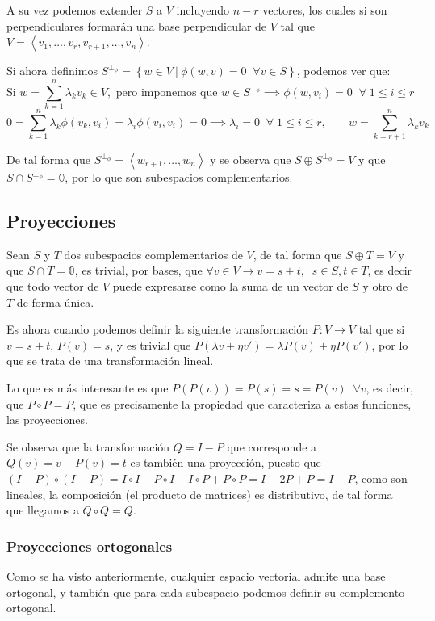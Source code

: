 \documentclass{preset}
\begin{document}
A su vez podemos extender $S$ a $V$ incluyendo $n-r$ vectores, los cuales si son perpendiculares formarán una base perpendicular de $V$ tal que $V=\left<v_1,\dots,v_r,v_{r+1},\dots,v_n\right>$.

\noindent Si ahora definimos $S^{\perp_\phi}=\left\{w \in V \: \vert \: \phi(w,v)=0 \;\; \forall v \in S\right\}$, podemos ver que:
\vspace{-10pt}
\[\mbox{Si } w=\sum_{k=1}^n{\lambda_kv_k} \in V, \mbox{ pero imponemos que } w\in S^{\perp_\phi} \implies \phi(w,v_i)=0 \;\; \forall \; 1\leq i\leq r\]
\vspace{-15pt}
\[0=\sum_{k=1}^n{\lambda_k \phi(v_k,v_i)}=\lambda_i \phi(v_i,v_i)=0 \implies \lambda_i=0 \;\; \forall \; 1\leq i\leq r, \;\;\;\;\;\;\; w=\sum_{k=r+1}^n{\lambda_k v_k}\]

\noindent De tal forma que $S^{\perp_\phi}=\left<w_{r+1},\dots,w_n\right>$ y se observa que $S\oplus S^{\perp_\phi}=V$ y que $S\cap S^{\perp_\phi}=\mathbb{0}$, por lo que son subespacios complementarios.

\vspace{-15pt}
\subsection{Proyecciones}
Sean $S$ y $T$ dos subespacios complementarios de $V$, de tal forma que $S\oplus T=V$ y que $S\cap T=\mathbb{0}$, es trivial, por bases, que $\forall v \in V \rightarrow v=s+t, \;\; s\in S, t\in T$, es decir que todo vector de $V$ puede expresarse como la suma de un vector de $S$ y otro de $T$ de forma única.

Es ahora cuando podemos definir la siguiente transformación $P: V\rightarrow V$ tal que si $v=s+t$, $P(v)=s$, y es trivial que $P(\lambda v+\eta v')= \lambda P(v) + \eta P(v')$, por lo que se trata de una transformación lineal.

Lo que es más interesante es que $P(P(v))=P(s)=s=P(v) \;\; \forall v$, es decir, que $P\circ P=P$, que es precisamente la propiedad que caracteriza a estas funciones, las proyecciones.

Se observa que la transformación $Q=I-P$ que corresponde a $Q(v)=v-P(v)=t$ es también una proyección, puesto que $(I-P)\circ(I-P)=I\circ I -P\circ I -I\circ P + P \circ P= I -2P +P=I-P$, como son lineales, la composición (el producto de matrices) es distributivo, de tal forma que llegamos a $Q\circ Q=Q$.

\vspace{-15pt}
\subsubsection{Proyecciones ortogonales}
Como se ha visto anteriormente, cualquier espacio vectorial admite una base ortogonal, y también que para cada subespacio podemos definir su complemento ortogonal.
\end{document}
